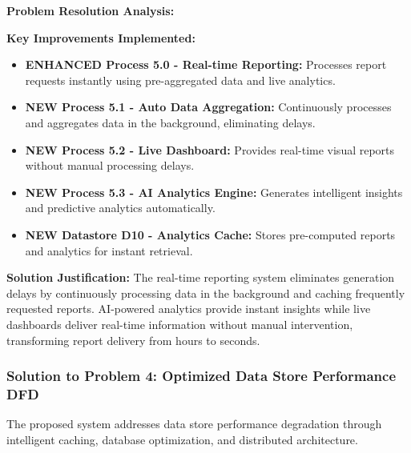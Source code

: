 \documentclass[12pt,a4paper,oneside]{book}
\begin{document}
\textbf{Problem Resolution Analysis:}

\textbf{Key Improvements Implemented:}
\begin{itemize}
    \item \textbf{ENHANCED Process 5.0 - Real-time Reporting:} Processes report requests instantly using pre-aggregated data and live analytics.
    \item \textbf{NEW Process 5.1 - Auto Data Aggregation:} Continuously processes and aggregates data in the background, eliminating delays.
    \item \textbf{NEW Process 5.2 - Live Dashboard:} Provides real-time visual reports without manual processing delays.
    \item \textbf{NEW Process 5.3 - AI Analytics Engine:} Generates intelligent insights and predictive analytics automatically.
    \item \textbf{NEW Datastore D10 - Analytics Cache:} Stores pre-computed reports and analytics for instant retrieval.
\end{itemize}

\textbf{Solution Justification:}
The real-time reporting system eliminates generation delays by continuously processing data in the background and caching frequently requested reports. AI-powered analytics provide instant insights while live dashboards deliver real-time information without manual intervention, transforming report delivery from hours to seconds.

\subsubsection{Solution to Problem 4: Optimized Data Store Performance DFD}

The proposed system addresses data store performance degradation through intelligent caching, database optimization, and distributed architecture.
\end{document}
